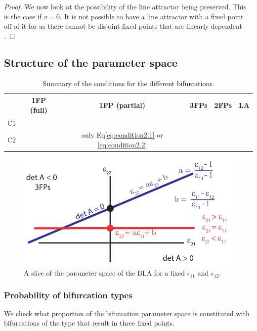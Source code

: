 \documentclass{article} %
\newcounter{ct}
\newcommand{\cmark}{\ding{51}}%
\newcommand{\xmark}{\ding{55}}%
\theoremstyle{definition}
\theoremstyle{remark}
\begin{document}
\begin{proof}
We now look at the possibility of the line attractor being preserved. 
This is the case if $v=0$.
It is not possible to have a line attractor with a fixed point off of it for as there cannot be disjoint fixed points that are linearly dependent \citep[Lemma 5.2]{morrison2016a}.
\end{proof}

\subsection{Structure of the parameter space}
\begin{table}[H]
\caption{Summary of the conditions for the different bifurcations.}\label{tab:bifs}
\centering
\bgroup
\def\arraystretch{1.52}
\begin{tabular}{|c||c|c|c|c|c|}
\hline
& 1FP (full) 		& 1FP (partial) & 3FPs & 2FPs & LA  \\\hline \hline
C1 & \cmark	 	& \xmark 	 & \cmark & \xmark & \xmark \\\hline 
C2 & \xmark 		& only Eq\ref{eq:condition2.1} or \ref{eq:condition2.2}  	 & \cmark & \cmark& \xmark \\\hline 
\end{tabular}
\egroup
\end{table}

\begin{figure}[H]
  \centering
  \includegraphics[width=\textwidth]{bla_parameter_space.pdf}
  \caption{A slice of the parameter space of the BLA for a fixed $\epsilon_{11}$ and $\epsilon_{12}$. %
  }
  \label{fig:blaparameterspace}
\end{figure}


\subsubsection{Probability of bifurcation types}
We check what proportion of the bifurcation parameter space is constituted with bifurcations of the type that result in three fixed points.
\end{document}
